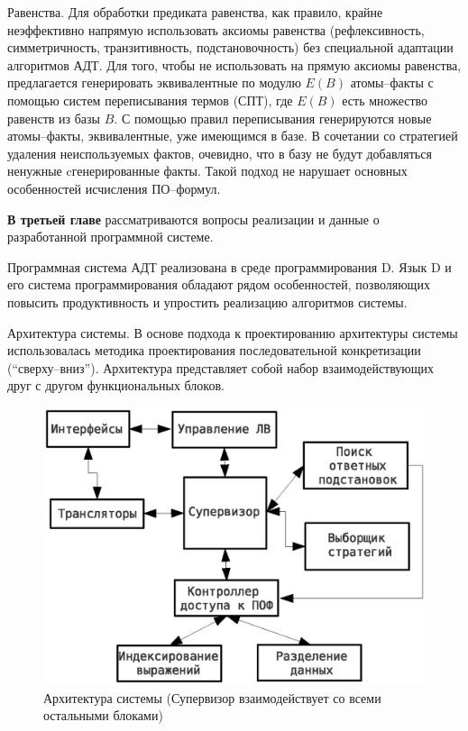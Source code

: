 \documentclass[a4paper]{report}
\begin{document}
Равенства. Для обработки предиката равенства, как правило, крайне неэффективно напрямую использовать аксиомы равенства (рефлексивность, симметричность, транзитивность, подстановочность) без специальной адаптации алгоритмов АДТ. Для того, чтобы не использовать на прямую аксиомы равенства, предлагается генерировать эквивалентные по модулю $E(B)$ атомы--факты с помощью систем переписывания термов (СПТ), где $E(B)$ есть множество равенств из базы $B$. С помощью правил переписывания генерируются новые атомы--факты, эквивалентные, уже имеющимся в базе. В сочетании со стратегией удаления неиспользуемых фактов, очевидно, что в базу не будут добавляться ненужные cгенерированные факты. Такой подход не нарушает основных особенностей исчисления ПО--формул. 

\textbf{В третьей главе} рассматриваются вопросы реализации и данные о разработанной программной системе.

Программная система АДТ реализована в среде программирования D. Язык D и его система программирования обладают рядом особенностей, позволяющих повысить продуктивность и упростить реализацию алгоритмов системы.

Архитектура системы. В основе подхода к проектированию архитектуры системы использовалась методика проектирования последовательной конкретизации (``сверху--вниз''). Архитектура представляет собой набор взаимодействующих друг с другом функциональных блоков.

\begin{figure}[h]
    \centering
    \includegraphics[width=0.7\linewidth]{pics/Design1.eps}
    \caption{Архитектура системы (Супервизор взаимодействует со всеми остальными блоками)}
    \label{fig:design1}
\end{figure}
\end{document}
